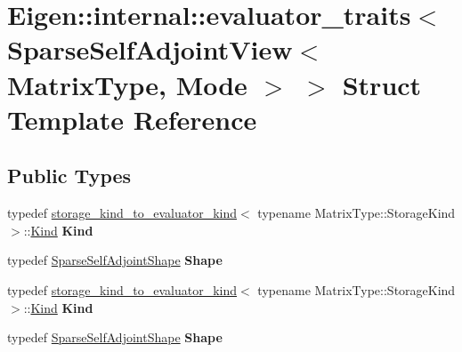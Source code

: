 \hypertarget{struct_eigen_1_1internal_1_1evaluator__traits_3_01_sparse_self_adjoint_view_3_01_matrix_type_00_01_mode_01_4_01_4}{}\section{Eigen\+:\+:internal\+:\+:evaluator\+\_\+traits$<$ Sparse\+Self\+Adjoint\+View$<$ Matrix\+Type, Mode $>$ $>$ Struct Template Reference}
\label{struct_eigen_1_1internal_1_1evaluator__traits_3_01_sparse_self_adjoint_view_3_01_matrix_type_00_01_mode_01_4_01_4}
\subsection*{Public Types}
\begin{DoxyCompactItemize}
\item 
\mbox{\label{struct_eigen_1_1internal_1_1evaluator__traits_3_01_sparse_self_adjoint_view_3_01_matrix_type_00_01_mode_01_4_01_4_a592360549f5868c1ebae4b6263b6fdf6}} 
typedef \hyperlink{struct_eigen_1_1internal_1_1storage__kind__to__evaluator__kind}{storage\+\_\+kind\+\_\+to\+\_\+evaluator\+\_\+kind}$<$ typename Matrix\+Type\+::\+Storage\+Kind $>$\+::\hyperlink{struct_eigen_1_1internal_1_1_index_based}{Kind} {\bfseries Kind}
\item 
\mbox{\label{struct_eigen_1_1internal_1_1evaluator__traits_3_01_sparse_self_adjoint_view_3_01_matrix_type_00_01_mode_01_4_01_4_a86d787406dd4237d16ffb6d88397cde7}} 
typedef \hyperlink{struct_eigen_1_1internal_1_1_sparse_self_adjoint_shape}{Sparse\+Self\+Adjoint\+Shape} {\bfseries Shape}
\item 
\mbox{\label{struct_eigen_1_1internal_1_1evaluator__traits_3_01_sparse_self_adjoint_view_3_01_matrix_type_00_01_mode_01_4_01_4_a592360549f5868c1ebae4b6263b6fdf6}} 
typedef \hyperlink{struct_eigen_1_1internal_1_1storage__kind__to__evaluator__kind}{storage\+\_\+kind\+\_\+to\+\_\+evaluator\+\_\+kind}$<$ typename Matrix\+Type\+::\+Storage\+Kind $>$\+::\hyperlink{struct_eigen_1_1internal_1_1_index_based}{Kind} {\bfseries Kind}
\item 
\mbox{\label{struct_eigen_1_1internal_1_1evaluator__traits_3_01_sparse_self_adjoint_view_3_01_matrix_type_00_01_mode_01_4_01_4_a86d787406dd4237d16ffb6d88397cde7}} 
typedef \hyperlink{struct_eigen_1_1internal_1_1_sparse_self_adjoint_shape}{Sparse\+Self\+Adjoint\+Shape} {\bfseries Shape}
\end{DoxyCompactItemize}



